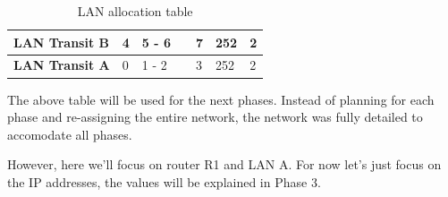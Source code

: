 \documentclass[11pt,a4paper]{report}
\begin{document}
\begin{table}[]
\begin{center}
\begin{tabular}{lllllll}
\cellcolor[HTML]{C09FE5}\textbf{LAN Transit B} & 4                          & 5 - 6               &                 & 7                                      & 252                                      & 2                                    \\ \hline
\cellcolor[HTML]{C09FE5}\textbf{LAN Transit A} & 0                          & 1 - 2               &                 & 3                                      & 252                                      & 2                                    \\ \hline
\end{tabular}
\caption{LAN allocation table}
\label{tab:lanalloctable}
\end{center}
\end{table}

The above table will be used for the next phases. Instead of planning for each phase and re-assigning the entire network, the network was fully detailed to accomodate all phases.

However, here we'll focus on router R1 and LAN A. For now let's just focus on the IP addresses, the values will be explained in Phase 3.
\end{document}
